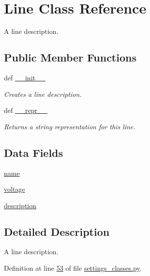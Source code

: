 \hypertarget{classsettings__classes_1_1_line}{\section{\-Line \-Class \-Reference}
\label{classsettings__classes_1_1_line}
}


\-A line description.  


\subsection*{\-Public \-Member \-Functions}
\begin{DoxyCompactItemize}
\item 
def \hyperlink{classsettings__classes_1_1_line_ac775ee34451fdfa742b318538164070e}{\-\_\-\-\_\-init\-\_\-\-\_\-}
\begin{DoxyCompactList}\small\item\em \-Creates a line description. \end{DoxyCompactList}\item 
def \hyperlink{classsettings__classes_1_1_line_ad8b9328939df072e4740cd9a63189744}{\-\_\-\-\_\-repr\-\_\-\-\_\-}
\begin{DoxyCompactList}\small\item\em \-Returns a string representation for this line. \end{DoxyCompactList}\end{DoxyCompactItemize}
\subsection*{\-Data \-Fields}
\begin{DoxyCompactItemize}
\item 
\hyperlink{classsettings__classes_1_1_line_ab74e6bf80237ddc4109968cedc58c151}{name}
\item 
\hyperlink{classsettings__classes_1_1_line_aa1a8261d8fb901476651f1666f993d4b}{voltage}
\item 
\hyperlink{classsettings__classes_1_1_line_a2661f439a4a94ffdcd5e47ae1da0bb1d}{description}
\end{DoxyCompactItemize}


\subsection{\-Detailed \-Description}
\-A line description. 

\-Definition at line \hyperlink{settings__classes_8py_source_l00053}{53} of file \hyperlink{settings__classes_8py_source}{settings\-\_\-classes.\-py}.



